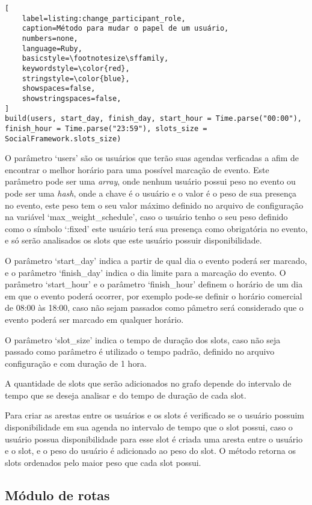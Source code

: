 \begin{lstlisting}[
    label=listing:change_participant_role,
    caption=Método para mudar o papel de um usuário,
    numbers=none,
    language=Ruby,
    basicstyle=\footnotesize\sffamily,
    keywordstyle=\color{red},
    stringstyle=\color{blue},
    showspaces=false,
    showstringspaces=false,
]
build(users, start_day, finish_day, start_hour = Time.parse("00:00"), finish_hour = Time.parse("23:59"), slots_size = SocialFramework.slots_size)
\end{lstlisting}

O parâmetro `users' são os usuários que terão suas agendas verficadas a afim de encontrar o melhor horário para uma possível marcação de evento. Este parâmetro pode ser uma \textit{array}, onde nenhum usuário possui peso no evento ou pode ser uma \textit{hash}, onde a chave é o usuário e o valor é o peso de sua presença no evento, este peso tem o seu valor máximo definido no arquivo de configuração na variável `max\_weight\_schedule', caso o usuário tenho o seu peso definido como o símbolo `:fixed' este usuário terá sua presença como obrigatória no evento, e só serão analisados os slots que este usuário possuir disponibilidade.

O parâmetro `start\_day' indica a partir de qual dia o evento poderá ser marcado, e o parâmetro `finish\_day' indica o dia limite para a marcação do evento. O parâmetro `start\_hour' e o parâmetro `finish\_hour' definem o horário de um dia em que o evento poderá ocorrer, por exemplo pode-se definir o horário comercial de 08:00 às 18:00, caso não sejam passados como pâmetro será considerado que o evento poderá ser marcado em qualquer horário.

O parâmetro `slot\_size' indica o tempo de duração dos slots, caso não seja passado como parâmetro é utilizado o tempo padrão, definido no arquivo configuração e com duração de 1 hora.

A quantidade de slots que serão adicionados no grafo depende do intervalo de tempo que se deseja analisar e do tempo de duração de cada slot.

Para criar as arestas entre os usuários e os slots é verificado se o usuário possuim disponibilidade em sua agenda no intervalo de tempo que o slot possui, caso o usuário possua disponibilidade para esse slot é criada uma aresta entre o usuário e o slot, e o peso do usuário é adicionado ao peso do slot. O método retorna os slots ordenados pelo maior peso que cada slot possui.

\subsection{Módulo de rotas}

